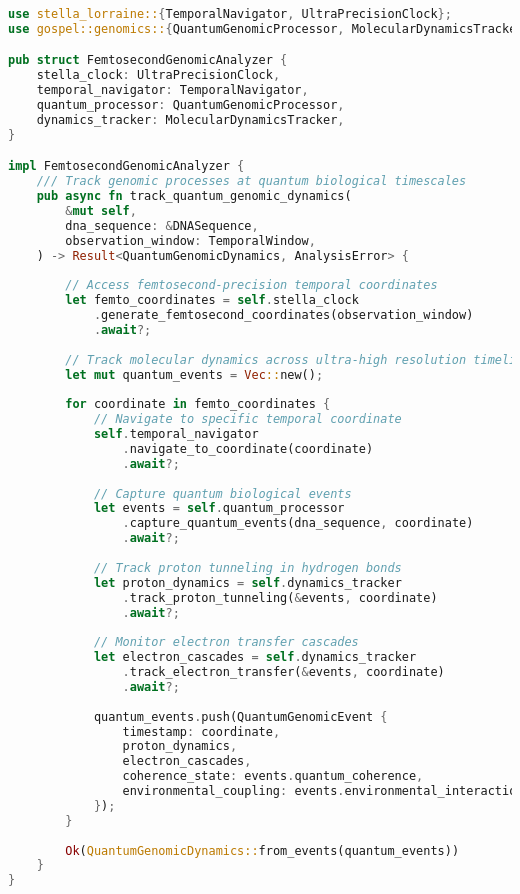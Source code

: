 \documentclass[12pt,a4paper]{article}
\begin{document}
\begin{lstlisting}[language=Rust, caption=Femtosecond Genomic Analysis Integration, basicstyle=\footnotesize]
use stella_lorraine::{TemporalNavigator, UltraPrecisionClock};
use gospel::genomics::{QuantumGenomicProcessor, MolecularDynamicsTracker};

pub struct FemtosecondGenomicAnalyzer {
    stella_clock: UltraPrecisionClock,
    temporal_navigator: TemporalNavigator,
    quantum_processor: QuantumGenomicProcessor,
    dynamics_tracker: MolecularDynamicsTracker,
}

impl FemtosecondGenomicAnalyzer {
    /// Track genomic processes at quantum biological timescales
    pub async fn track_quantum_genomic_dynamics(
        &mut self,
        dna_sequence: &DNASequence,
        observation_window: TemporalWindow,
    ) -> Result<QuantumGenomicDynamics, AnalysisError> {
        
        // Access femtosecond-precision temporal coordinates
        let femto_coordinates = self.stella_clock
            .generate_femtosecond_coordinates(observation_window)
            .await?;
        
        // Track molecular dynamics across ultra-high resolution timeline
        let mut quantum_events = Vec::new();
        
        for coordinate in femto_coordinates {
            // Navigate to specific temporal coordinate
            self.temporal_navigator
                .navigate_to_coordinate(coordinate)
                .await?;
            
            // Capture quantum biological events
            let events = self.quantum_processor
                .capture_quantum_events(dna_sequence, coordinate)
                .await?;
            
            // Track proton tunneling in hydrogen bonds
            let proton_dynamics = self.dynamics_tracker
                .track_proton_tunneling(&events, coordinate)
                .await?;
            
            // Monitor electron transfer cascades
            let electron_cascades = self.dynamics_tracker
                .track_electron_transfer(&events, coordinate)
                .await?;
            
            quantum_events.push(QuantumGenomicEvent {
                timestamp: coordinate,
                proton_dynamics,
                electron_cascades,
                coherence_state: events.quantum_coherence,
                environmental_coupling: events.environmental_interaction,
            });
        }
        
        Ok(QuantumGenomicDynamics::from_events(quantum_events))
    }
}
\end{lstlisting}
\end{document}
